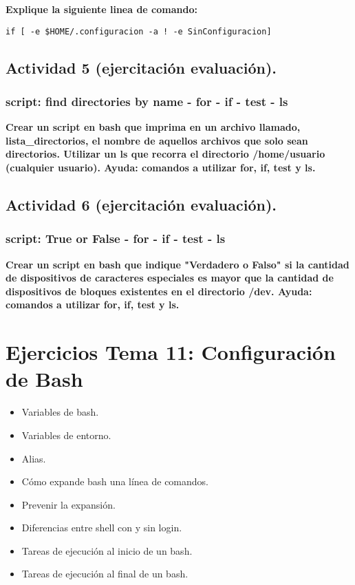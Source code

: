 \documentclass[a4paper,11pt,spanish]{article} %
\begin{document}
\textbf{Explique la siguiente linea de comando:}

\begin{verbatim}
if [ -e $HOME/.configuracion -a ! -e SinConfiguracion]
\end{verbatim}

\subsection{Actividad 5 (ejercitación evaluación).}

\subsubsection{script: find directories by name - for - if - test - ls}

\textbf{Crear un script en bash que imprima en un archivo llamado, lista\_directorios, 
el nombre de aquellos archivos que solo sean directorios. 
Utilizar un ls que recorra el directorio /home/usuario (cualquier usuario).
Ayuda: comandos a utilizar  for, if, test y ls.}

\subsection{Actividad 6 (ejercitación evaluación).}

\subsubsection{script: True or False - for - if - test - ls}

\textbf{Crear un script en bash que indique "Verdadero o Falso" si la cantidad de dispositivos de caracteres 
especiales es mayor que la cantidad de dispositivos de bloques existentes en el directorio /dev.
Ayuda: comandos a utilizar  for, if, test  y ls.}

\pagebreak

\section{Ejercicios Tema 11: Configuración de Bash}

\begin{itemize}
 \item Variables de bash.
 \item Variables de entorno.
 \item Alias.
 \item Cómo expande bash una línea de comandos.
 \item Prevenir la expansión.
 \item Diferencias entre shell con y sin login.
 \item Tareas de ejecución al inicio de un bash.
 \item Tareas de ejecución al final de un bash.
 \end{itemize}
\end{document}
